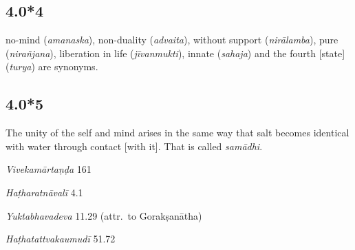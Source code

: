 \begin{ekdosis}
\subsection*{4.0*4}
\begin{translation}[hp04_000_4]
[\dots] no-mind (\emph{amanaska}), non-duality (\emph{advaita}), without support (\emph{nirālamba}), pure (\emph{nirañjana}), liberation in life (\emph{jīvanmukti}), innate (\emph{sahaja}) and the fourth [state] (\emph{turya}) are synonyms.
\end{translation}

\subsection*{4.0*5}
\begin{translation}[hp04_000_5]
The unity of the self and mind arises in the same way that salt becomes identical with water through contact [with it]. That is called \emph{samādhi}.
\end{translation}

\begin{sources}[hp04_000_5]
\emph{Vivekamārtaṇḍa} 161
\begin{versinnote}
\end{versinnote}
\end{sources}

\begin{testimonia}[hp04_000_5]
\emph{Haṭharatnāvalī} 4.1
\begin{versinnote}
\end{versinnote}

\emph{Yuktabhavadeva} 11.29 (attr.~to Gorakṣanātha)
\begin{versinnote}
\end{versinnote}

\emph{Haṭhatattvakaumudī} 51.72
\begin{versinnote}
\end{versinnote}
\end{testimonia}


\end{ekdosis}
